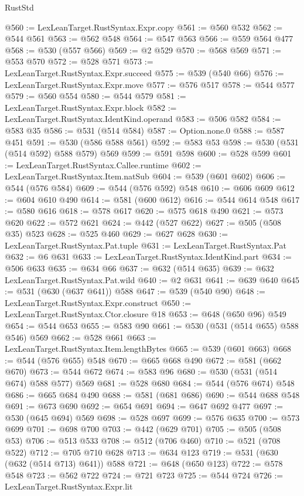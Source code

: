 \begin{lexlean}{RustStd}
\begin{coremodule}
{\begin{coremodule}
{{{{{{{{{{{{{{@560 := LexLeanTarget.RustSyntax.Expr.copy
@561 := @560 @532
@562 := @544 @561
@563 := @562 @548
@564 := @547 @563
@566 := @559 @564 @477
@568 := @530 (@557 @566)
@569 := @2 @529
@570 := @568 @569
@571 := @553 @570
@572 := @528 @571
@573 := LexLeanTarget.RustSyntax.Expr.succeed
@575 := @539 (@540 @66)
@576 := LexLeanTarget.RustSyntax.Expr.move
@577 := @576 @517
@578 := @544 @577
@579 := @560 @554
@580 := @544 @579
@581 := LexLeanTarget.RustSyntax.Expr.block
@582 := LexLeanTarget.RustSyntax.IdentKind.operand
@583 := @506 @582
@584 := @583 @35
@586 := @531 (@514 @584)
@587 := Option.none.{0}
@588 := @587 @451
@591 := @530 (@586 @588 @561)
@592 := @583 @53
@598 := @530 (@531 (@514 @592) @588 @579) @569
@599 := @591 @598
@600 := @528 @599
@601 := LexLeanTarget.RustSyntax.Callee.runtime
@602 := LexLeanTarget.RustSyntax.Item.natSub
@604 := @539 (@601 @602)
@606 := @544 (@576 @584)
@609 := @544 (@576 @592) @548
@610 := @606 @609
@612 := @604 @610 @490
@614 := @581 (@600 @612)
@616 := @544 @614 @548
@617 := @580 @616
@618 := @578 @617
@620 := @575 @618 @490
@621 := @573 @620
@622 := @572 @621
@624 := @442 (@527 @622)
@627 := @505 (@508 @35) @523
@628 := @525 @460
@629 := @627 @628
@630 := LexLeanTarget.RustSyntax.Pat.tuple
@631 := LexLeanTarget.RustSyntax.Pat
@632 := @6 @631
@633 := LexLeanTarget.RustSyntax.IdentKind.part
@634 := @506 @633
@635 := @634 @66
@637 := @632 (@514 @635)
@639 := @632 LexLeanTarget.RustSyntax.Pat.wild
@640 := @2 @631
@641 := @639 @640
@645 := @531 (@630 (@637 @641)) @588
@647 := @539 (@540 @90)
@648 := LexLeanTarget.RustSyntax.Expr.construct
@650 := LexLeanTarget.RustSyntax.Ctor.closure @18
@653 := @648 (@650 @96) @549
@654 := @544 @653
@655 := @583 @90
@661 := @530 (@531 (@514 @655) @588 @546) @569
@662 := @528 @661
@663 := LexLeanTarget.RustSyntax.Item.lengthBytes
@665 := @539 (@601 @663)
@668 := @544 (@576 @655) @548
@670 := @665 @668 @490
@672 := @581 (@662 @670)
@673 := @544 @672
@674 := @583 @96
@680 := @530 (@531 (@514 @674) @588 @577) @569
@681 := @528 @680
@684 := @544 (@576 @674) @548
@686 := @665 @684 @490
@688 := @581 (@681 @686)
@690 := @544 @688 @548
@691 := @673 @690
@692 := @654 @691
@694 := @647 @692 @477
@697 := @530 (@645 @694) @569
@698 := @528 @697
@699 := @576 @635
@700 := @573 @699
@701 := @698 @700
@703 := @442 (@629 @701)
@705 := @505 (@508 @53)
@706 := @513 @533
@708 := @512 (@706 @460)
@710 := @521 (@708 @522)
@712 := @705 @710 @628
@713 := @634 @123
@719 := @531 (@630 (@632 (@514 @713) @641)) @588
@721 := @648 (@650 @123)
@722 := @578 @548
@723 := @562 @722
@724 := @721 @723
@725 := @544 @724
@726 := LexLeanTarget.RustSyntax.Expr.lit
}}}}}}}}}}}}}}
\end{coremodule}}
\end{coremodule}
\end{lexlean}
